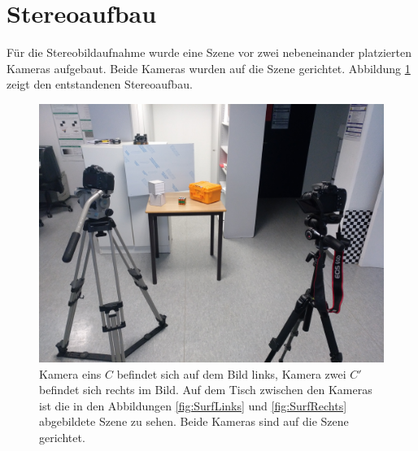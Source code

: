 \section{Stereoaufbau}


Für die Stereobildaufnahme wurde eine Szene vor zwei nebeneinander platzierten Kameras aufgebaut. Beide Kameras wurden auf die Szene gerichtet. Abbildung \ref{fig:StereoaufbauReal} zeigt den entstandenen Stereoaufbau.\\





\begin{figure}[!htb]
	\centering
	\includegraphics[width=.7\linewidth]{images/SetUpSameResolution.jpg}
	\caption[Stereoaufbau im Überblick]{Kamera eins $C$ befindet sich auf dem Bild links, Kamera zwei $C'$ befindet sich rechts im Bild. Auf dem Tisch zwischen den Kameras ist die in den Abbildungen \ref{fig:SurfLinks} und \ref{fig:SurfRechts} abgebildete Szene zu sehen. Beide Kameras sind auf die Szene gerichtet.}
	\label{fig:StereoaufbauReal}
\end{figure}



